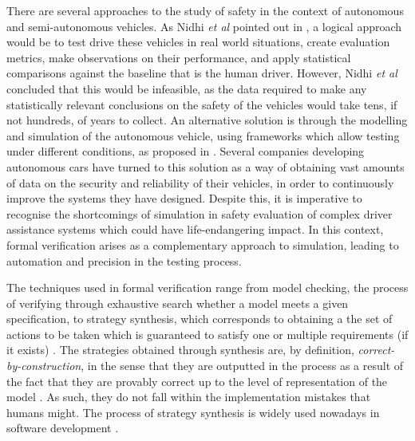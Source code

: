 There are several approaches to the study of safety in the context of autonomous and semi-autonomous vehicles. As Nidhi \textit{et al} pointed out in \cite{driving-to-safety}, a logical approach would be to test drive these vehicles in real world situations, create evaluation metrics, make observations on their performance, and apply statistical comparisons against the baseline that is the human driver. However, Nidhi \textit{et al} concluded that this would be infeasible, as the data required to make any statistically relevant conclusions on the safety of the vehicles would take tens, if not hundreds, of years to collect. An alternative solution is through the modelling and simulation of the autonomous vehicle, using frameworks which allow testing under different conditions, as proposed in \cite{sim1, sim2, sim3, sim4}. Several companies developing autonomous cars have turned to this solution as a way of obtaining vast amounts of data on the security and reliability of their vehicles, in order to continuously improve the systems they have designed. Despite this, it is imperative to recognise the shortcomings of simulation in safety evaluation of complex driver assistance systems \cite{challenges1, challenges2} which could have life-endangering impact. In this context, formal verification arises as a complementary approach to simulation, leading to automation and precision in the testing process.

The techniques used in formal verification range from model checking, the process of verifying through exhaustive search whether a model meets a given specification, to strategy synthesis, which corresponds to obtaining a the set of actions to be taken which is guaranteed to satisfy one or multiple requirements (if it exists) \cite{bk08}. The strategies obtained through synthesis are, by definition, \textit{correct-by-construction}, in the sense that they are outputted in the process as a result of the fact that they are provably correct up to the level of representation of the model \cite{bk08}. As such, they do not fall within the implementation mistakes that humans might. The process of strategy synthesis is widely used nowadays in software development \cite{software_1, software_2, software_3}. 


